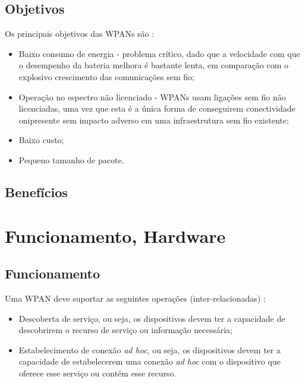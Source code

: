 \documentclass[conference]{IEEEtran}
\begin{document}
\subsection{Objetivos}

Os principais objetivos das WPANs são \cite{prasad2004ofdm}:

\begin{itemize}

 \item Baixo consumo de energia - problema crítico, dado que a velocidade com que o desempenho da bateria melhora é bastante lenta, em comparação com o explosivo crescimento das comunicações sem fio;
 \item Operação no espectro não licenciado - WPANs usam ligações sem fio não licenciadas, uma vez que esta é a única forma de conseguirem conectividade onipresente sem impacto adverso em uma infraestrutura sem fio existente;
 \item Baixo custo;
 \item Pequeno tamanho de pacote.
 
\end{itemize}

\subsection{Benefícios}



\section{Funcionamento, Hardware}

\subsection{Funcionamento}

Uma WPAN deve suportar as seguintes operações (inter-relacionadas) \cite{prasad2004ofdm}:

\begin{itemize}

 \item Descoberta de serviço, ou seja, os dispositivos devem ter a capacidade de descobrirem o recurso de serviço ou informação necessária;
 \item Estabelecimento de conexão \textit{ad hoc}, ou seja, os dispositivos devem ter a capacidade de estabelecerem uma conexão \textit{ad hoc} com o dispositivo que oferece esse serviço ou contém esse recurso.
 
\end{itemize}
\end{document}
